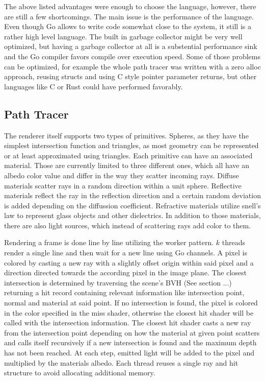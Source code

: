 The above listed advantages were enough to choose the language, however, there are still a few shortcomings. The main issue is the performance of the language. Even though Go allows to write code somewhat close to the system, it still is a rather high level language. The built in garbage collector might be very well optimized, but having a garbage collector at all is a substential performance sink and the Go compiler favors compile over execution speed. Some of those problems can be optimized, for example the whole path tracer was written with a zero alloc approach, reusing structs and using C style pointer parameter returns, but other languages like C or Rust could have performed favorably.

\subsection{Path Tracer}
The renderer itself supports two types of primitives. Spheres, as they have the simplest intersection function and triangles, 
as most geometry can be represented or at least approximated using triangles. Each primitive can have an associated material. Those are currently limited to three different ones, which all have an albedo color value and differ in the way they scatter incoming rays. Diffuse materials scatter rays in a random direction within a unit sphere. Reflective materials reflect the ray in the reflection direction and a certain random deviation is added depending on the diffussion coefficient. Refractive materials utilize snell's law to represent glass objects and other dielectrics. In addition to those materials, there are also light sources, which instead of scattering rays add color to them. 

Rendering a frame is done line by line utilizing the worker pattern. $k$ threads render a single line and then wait for a new 
line using Go channels. A pixel is colored by casting a new ray with a slightly offset origin within said pixel and a direction directed towards the according pixel in the image plane. The closest intersection is determined by traversing the 
scene's BVH (See section ...) returning a hit record containing relevant information like intersection point, normal and material at said point. If no intersection is found, the pixel is colored in the color specified in the miss shader, otherwise the closest hit shader will be called with the intersection information. The closest hit shader casts a new ray from the intersection point depending on how the material at given point scatters and calls itself recursively if a new intersection is found and the maximum depth has not been reached. At each step, emitted light will be added to the pixel and multiplied by the materials albedo. Each thread reuses a single ray and hit structure to avoid allocating additional memory.
